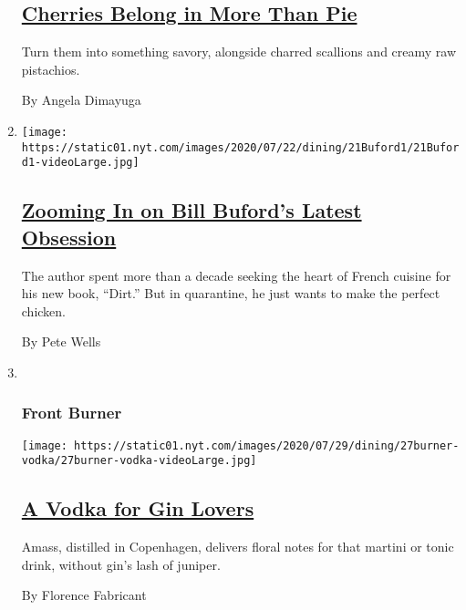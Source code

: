\begin{enumerate}
  \hypertarget{cherries-belong-in-more-than-pie}{%
  \subsection{\texorpdfstring{\href{/2020/07/24/dining/cherry-salad-recipe.html}{Cherries
  Belong in More Than
  Pie}}{Cherries Belong in More Than Pie}}\label{cherries-belong-in-more-than-pie}}

  Turn them into something savory, alongside charred scallions and
  creamy raw pistachios.

  By Angela Dimayuga
\item
  \texttt{[image: https://static01.nyt.com/images/2020/07/22/dining/21Buford1/21Buford1-videoLarge.jpg]}

  \hypertarget{zooming-in-on-bill-bufords-latest-obsession}{%
  \subsection{\texorpdfstring{\href{/2020/07/21/dining/bill-buford-dirt-book-chicken-recipe.html}{Zooming
  In on Bill Buford's Latest
  Obsession}}{Zooming In on Bill Buford's Latest Obsession}}\label{zooming-in-on-bill-bufords-latest-obsession}}

  The author spent more than a decade seeking the heart of French
  cuisine for his new book, ``Dirt.'' But in quarantine, he just wants
  to make the perfect chicken.

  By Pete Wells
\item ~
  \hypertarget{front-burner}{%
  \subsubsection{Front Burner}\label{front-burner}}

  \texttt{[image: https://static01.nyt.com/images/2020/07/29/dining/27burner-vodka/27burner-vodka-videoLarge.jpg]}

  \hypertarget{a-vodka-for-gin-lovers}{%
  \subsection{\texorpdfstring{\href{/2020/07/27/dining/amass-vodka.html}{A
  Vodka for Gin
  Lovers}}{A Vodka for Gin Lovers}}\label{a-vodka-for-gin-lovers}}

  Amass, distilled in Copenhagen, delivers floral notes for that martini
  or tonic drink, without gin's lash of juniper.

  By Florence Fabricant
\end{enumerate}

